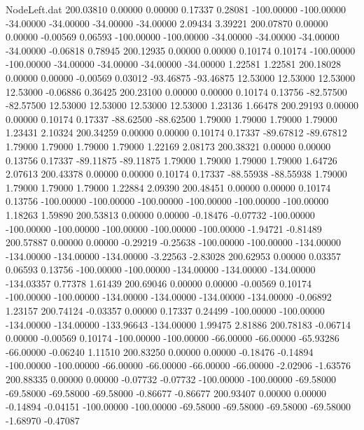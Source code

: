 \begin{filecontents}{NodeLeft.dat}
 200.03810    0.00000    0.00000     0.17337    0.28081 -100.00000 -100.00000  -34.00000  -34.00000  -34.00000  -34.00000    2.09434    3.39221
 200.07870    0.00000    0.00000    -0.00569    0.06593 -100.00000 -100.00000  -34.00000  -34.00000  -34.00000  -34.00000   -0.06818    0.78945
 200.12935    0.00000    0.00000     0.10174    0.10174 -100.00000 -100.00000  -34.00000  -34.00000  -34.00000  -34.00000    1.22581    1.22581
 200.18028    0.00000    0.00000    -0.00569    0.03012  -93.46875  -93.46875   12.53000   12.53000   12.53000   12.53000   -0.06886    0.36425
 200.23100    0.00000    0.00000     0.10174    0.13756  -82.57500  -82.57500   12.53000   12.53000   12.53000   12.53000    1.23136    1.66478
 200.29193    0.00000    0.00000     0.10174    0.17337  -88.62500  -88.62500    1.79000    1.79000    1.79000    1.79000    1.23431    2.10324
 200.34259    0.00000    0.00000     0.10174    0.17337  -89.67812  -89.67812    1.79000    1.79000    1.79000    1.79000    1.22169    2.08173
 200.38321    0.00000    0.00000     0.13756    0.17337  -89.11875  -89.11875    1.79000    1.79000    1.79000    1.79000    1.64726    2.07613
 200.43378    0.00000    0.00000     0.10174    0.17337  -88.55938  -88.55938    1.79000    1.79000    1.79000    1.79000    1.22884    2.09390
 200.48451    0.00000    0.00000     0.10174    0.13756 -100.00000 -100.00000 -100.00000 -100.00000 -100.00000 -100.00000    1.18263    1.59890
 200.53813    0.00000    0.00000    -0.18476   -0.07732 -100.00000 -100.00000 -100.00000 -100.00000 -100.00000 -100.00000   -1.94721   -0.81489
 200.57887    0.00000    0.00000    -0.29219   -0.25638 -100.00000 -100.00000 -134.00000 -134.00000 -134.00000 -134.00000   -3.22563   -2.83028
 200.62953    0.00000    0.03357     0.06593    0.13756 -100.00000 -100.00000 -134.00000 -134.00000 -134.00000 -134.03357    0.77378    1.61439
 200.69046    0.00000    0.00000    -0.00569    0.10174 -100.00000 -100.00000 -134.00000 -134.00000 -134.00000 -134.00000   -0.06892    1.23157
 200.74124   -0.03357    0.00000     0.17337    0.24499 -100.00000 -100.00000 -134.00000 -134.00000 -133.96643 -134.00000    1.99475    2.81886
 200.78183   -0.06714    0.00000    -0.00569    0.10174 -100.00000 -100.00000  -66.00000  -66.00000  -65.93286  -66.00000   -0.06240    1.11510
 200.83250    0.00000    0.00000    -0.18476   -0.14894 -100.00000 -100.00000  -66.00000  -66.00000  -66.00000  -66.00000   -2.02906   -1.63576
 200.88335    0.00000    0.00000    -0.07732   -0.07732 -100.00000 -100.00000  -69.58000  -69.58000  -69.58000  -69.58000   -0.86677   -0.86677
 200.93407    0.00000    0.00000    -0.14894   -0.04151 -100.00000 -100.00000  -69.58000  -69.58000  -69.58000  -69.58000   -1.68970   -0.47087

\end{filecontents}
